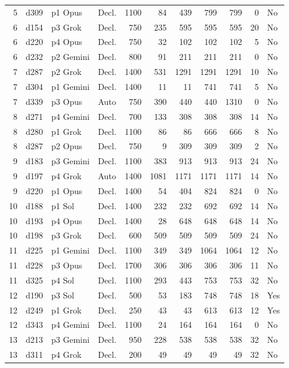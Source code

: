 \begin{longtable}{r l l l r r r r r r l}
5 & d309 & p1 Opus & Decl. & 1100 & 84 & 439 & 799 & 799 & 0 & No \\
6 & d154 & p3 Grok & Decl. & 750 & 235 & 595 & 595 & 595 & 20 & No \\
6 & d220 & p4 Opus & Decl. & 750 & 32 & 102 & 102 & 102 & 5 & No \\
6 & d232 & p2 Gemini & Decl. & 800 & 91 & 211 & 211 & 211 & 0 & No \\
7 & d287 & p2 Grok & Decl. & 1400 & 531 & 1291 & 1291 & 1291 & 10 & No \\
7 & d304 & p1 Gemini & Decl. & 1400 & 11 & 11 & 741 & 741 & 5 & No \\
7 & d339 & p3 Opus & Auto & 750 & 390 & 440 & 440 & 1310 & 0 & No \\
8 & d271 & p4 Gemini & Decl. & 700 & 133 & 308 & 308 & 308 & 14 & No \\
8 & d280 & p1 Grok & Decl. & 1100 & 86 & 86 & 666 & 666 & 8 & No \\
8 & d287 & p2 Opus & Decl. & 750 & 9 & 309 & 309 & 309 & 2 & No \\
9 & d183 & p3 Gemini & Decl. & 1100 & 383 & 913 & 913 & 913 & 24 & No \\
9 & d197 & p4 Grok & Auto & 1400 & 1081 & 1171 & 1171 & 1171 & 14 & No \\
9 & d220 & p1 Opus & Decl. & 1400 & 54 & 404 & 824 & 824 & 0 & No \\
10 & d188 & p1 Sol & Decl. & 1400 & 232 & 232 & 692 & 692 & 14 & No \\
10 & d193 & p4 Opus & Decl. & 1400 & 28 & 648 & 648 & 648 & 14 & No \\
10 & d198 & p3 Grok & Decl. & 600 & 509 & 509 & 509 & 509 & 24 & No \\
11 & d225 & p1 Gemini & Decl. & 1100 & 349 & 349 & 1064 & 1064 & 12 & No \\
11 & d228 & p3 Opus & Decl. & 1700 & 306 & 306 & 306 & 306 & 11 & No \\
11 & d325 & p4 Sol & Decl. & 1100 & 293 & 443 & 753 & 753 & 32 & No \\
12 & d190 & p3 Sol & Decl. & 500 & 53 & 183 & 748 & 748 & 18 & Yes \\
12 & d249 & p1 Grok & Decl. & 250 & 43 & 43 & 613 & 613 & 12 & Yes \\
12 & d343 & p4 Gemini & Decl. & 1100 & 24 & 164 & 164 & 164 & 0 & No \\
13 & d213 & p3 Gemini & Decl. & 950 & 228 & 538 & 538 & 538 & 32 & No \\
13 & d311 & p4 Grok & Decl. & 200 & 49 & 49 & 49 & 49 & 32 & No \\

\end{longtable}
